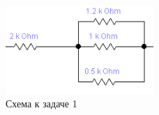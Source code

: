 \begin{figure}
  \begin{changemargin}{-2cm}{0cm}
  \begin{center}
    \includegraphics[width=0.5\textwidth]{authors/stepanuk-2-fig-1.png}
  \end{center}
  \caption{Схема к задаче 1}
  \end{changemargin}
  \label{fig:stepanuk-2-fig-1}
\end{figure}
